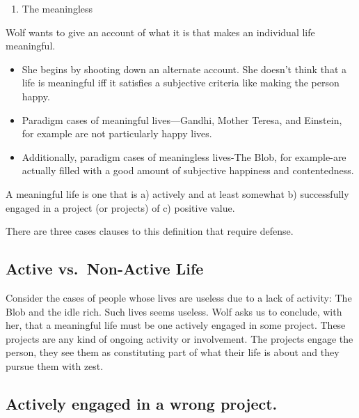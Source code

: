 \documentclass[]{article}
\providecommand{\tightlist}{%
  \setlength{\itemsep}{0pt}\setlength{\parskip}{0pt}}
\begin{document}
\begin{enumerate}
\def\labelenumi{\arabic{enumi}.}
\tightlist
\item
  The meaningless
\end{enumerate}

Wolf wants to give an account of what it is that makes an individual
life meaningful.

\begin{itemize}
\item
  She begins by shooting down an alternate account. She doesn't think
  that a life is meaningful iff it satisfies a subjective criteria like
  making the person happy.
\item
  Paradigm cases of meaningful lives---Gandhi, Mother Teresa, and
  Einstein, for example are not particularly happy lives.
\item
  Additionally, paradigm cases of meaningless lives-The Blob, for
  example-are actually filled with a good amount of subjective happiness
  and contentedness.
\end{itemize}

\begin{description}
\tightlist
\item[Wolf's account:]
A meaningful life is one that is a) actively and at least somewhat b)
successfully engaged in a project (or projects) of c) positive value.
\end{description}

There are three cases clauses to this definition that require defense.

\subsection{Active vs.~Non-Active Life}\label{active-vs.non-active-life}

Consider the cases of people whose lives are useless due to a lack of
activity: The Blob and the idle rich. Such lives seems useless. Wolf
asks us to conclude, with her, that a meaningful life must be one
actively engaged in some project. These projects are any kind of ongoing
activity or involvement. The projects engage the person, they see them
as constituting part of what their life is about and they pursue them
with zest.

\subsection{Actively engaged in a wrong
project.}\label{actively-engaged-in-a-wrong-project.}
\end{document}
